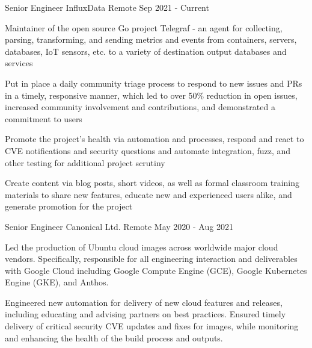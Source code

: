 

\begin{cventries}

  \cventry
    {Senior Engineer}
    {InfluxData}
    {Remote}
    {Sep 2021 - Current}
    {
      \begin{cvitems}
        \item {
          Maintainer of the open source Go project Telegraf - an agent for
          collecting, parsing, transforming, and sending metrics and events
          from containers, servers, databases, IoT sensors, etc. to a variety
          of destination output databases and services
        }
        \item {
          Put in place a daily community triage process to respond to new
          issues and PRs in a timely, responsive manner, which led to over 50\%
          reduction in open issues, increased community involvement and
          contributions, and demonstrated a commitment to users
        }
        \item {
          Promote the project's health via automation and processes, respond
          and react to CVE notifications and security questions and automate
          integration, fuzz, and other testing for additional project scrutiny
        }
        \item {
          Create content via blog posts, short videos, as well as formal
          classroom training materials to share new features, educate new and
          experienced users alike, and generate promotion for the project
        }
      \end{cvitems}
    }
    {}

  \cventry
    {Senior Engineer}
    {Canonical Ltd.}
    {Remote}
    {May 2020 - Aug 2021}
    {
      \begin{cvitems}
        \item {
          Led the production of Ubuntu cloud images across worldwide major
          cloud vendors. Specifically, responsible for all engineering
          interaction and deliverables with Google Cloud including Google
          Compute Engine (GCE), Google Kubernetes Engine (GKE), and Anthos.
        }
        \item {
          Engineered new automation for delivery of new cloud features and
          releases, including educating and advising partners on best
          practices. Ensured timely delivery of critical security CVE updates
          and fixes for images, while monitoring and enhancing the health of the
          build process and outputs.
        }
      \end{cvitems}
    }
    {}


\end{cventries}

